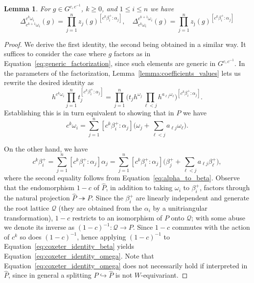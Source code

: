 \documentclass[12pt]{amsart}
\newcommand{\cQ}{\mathcal{Q}}
\newcommand\onto{\twoheadrightarrow}
\newcommand\into{\hookrightarrow}
\newcommand{\ol}[1]{\overline{#1}}
\newtheorem{lemma}[theorem]{Lemma}
\theoremstyle{remark}
\numberwithin{equation}{section}
\numberwithin{figure}{section}
\begin{document}
\begin{lemma}
  \label{lemma:coefficient_identity_powers}
  For $g \in G^{c,c^{-1}}$, $k \geq 0$, and $1 \leq i \leq n$ we have
  \begin{equation*}
    \Delta_{c^{k+1} \omega_i}^{c^k \omega_i}(g)
    =
    \prod_{j=1}^nz_j(g)^{[c^k\beta_i^+:\alpha_j]},\quad
    \Delta_{c^k \omega_i}^{c^{k+1} \omega_i}(g)
    =
    \prod_{j=1}^nz_{\ol{\jmath}}(g)^{[c^k\beta_i^+:\alpha_j]}
  \end{equation*}
\end{lemma}
\begin{proof}
  We derive the first identity, the second being obtained in a similar way.
  It suffices to consider the case where $g$ factors as in Equation~\eqref{eq:generic_factorization}, since such elements are generic in $G^{c,c^{-1}}$.
  In the parameters of the factorization, Lemma~\ref{lemma:coefficients_values} lets us rewrite the desired identity as
  \[
    h^{c^k\omega_i}\prod_{j=1}^n t_{j}^{[c^k\beta_i^+:\alpha_j]}
    =
    \prod_{j=1}^n\Big( t_j h^{\omega_j}\prod_{ \ell <j}h^{a_{\ell j}\omega_ \ell }\Big)^{[c^k\beta_i^+:\alpha_j]}.
  \]
  Establishing this is in turn equivalent to showing that in $P$ we have
  \begin{equation}
    \label{eq:coxeter_identity_omega}
    c^k\omega_i
    =
    \sum_{j=1}^n
    [c^k\beta_i^+:\alpha_j]
    \Big(
    \omega_j+
    \sum_{\ell<j} a_{\ell j}\omega_\ell
    \Big).
  \end{equation}

  On the other hand, we have
  \begin{equation}
    \label{eq:coxeter_identity_beta}
    c^k\beta_i^+
    =
    \sum_{j=1}^n [c^k\beta_i^+:\alpha_j] \alpha_j
    =
    \sum_{j=1}^n [c^k\beta_i^+:\alpha_j] \Big(\beta_j^+ + \sum_{\ell<j} a_{\ell j}\beta_\ell^+\Big),
  \end{equation}
  where the second equality follows from Equation~\eqref{eq:alpha_to_beta}.
  Observe that the endomorphism $1-c$ of $\widehat{P}$, in addition to taking $\omega_i$ to $\beta_i^+$, factors through the natural projection $\widehat{P} \onto P$.
  Since the $\beta_i^+$ are linearly independent and generate the root lattice $\cQ$ (they are obtained from the $\alpha_i$ by a unitriangular transformation), $1-c$ restricts to an isomorphism of $P$ onto $\cQ$; with some abuse we denote its inverse as $(1-c)^{-1}: \cQ \to P$.
  Since $1-c$ commutes with the action of $c^{k}$ so does $(1-c)^{-1}$, hence applying $(1-c)^{-1}$ to Equation~\eqref{eq:coxeter_identity_beta} yields Equation~\eqref{eq:coxeter_identity_omega}.
  Note that Equation~\eqref{eq:coxeter_identity_omega} does not necessarily hold if interpreted in $\widehat{P}$, since in general a splitting $P \into \widehat{P}$ is not $W$-equivariant.
\end{proof}
\end{document}
